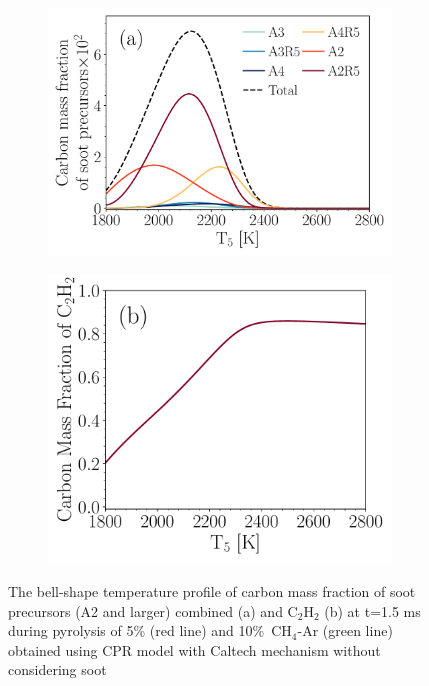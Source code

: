\begin{figure}[H]
	\centering
	\begin{subfigure}[t]{0.4\textwidth}
		\includegraphics[width=1\textwidth]{Figures/Results/Shocktube/Agafonov2016_cpr/SPC_cmf_separate.pdf}
	\end{subfigure}
	\begin{subfigure}[t]{0.36\textwidth}
		\includegraphics[width=1\textwidth]{Figures/Results/Shocktube/Agafonov2016_cpr/C2H2_cmf.pdf}
	\end{subfigure}
	\caption{The bell-shape temperature profile of carbon mass fraction of soot precursors (A2 and larger) combined (a) and $\mathrm{C_2H_2}$ (b) at t=1.5 ms during pyrolysis of 5\% (red line) and 10\%~$\mathrm{CH_4}$-Ar (green line) obtained using CPR model with Caltech mechanism without considering soot}
	\label{fig:SPC_cmf_cpr} 
\end{figure}


